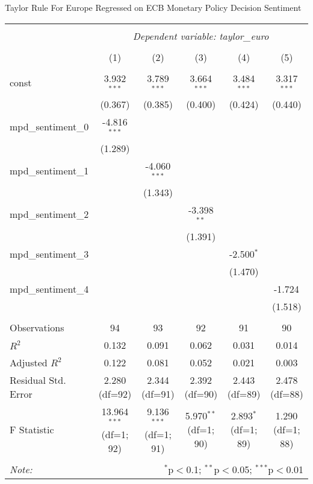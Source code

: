 \documentclass{article}
\begin{document}
Taylor Rule For Europe Regressed on ECB Monetary Policy Decision Sentiment

\begin{table}[H]
\begin{adjustbox}{width=\textwidth}
\centering
\begin{tabular}{@{}lccccc@{}}
\\[-1.8ex]\hline
\hline \\[-1.8ex]
& \multicolumn{5}{c}{\textit{Dependent variable: taylor\_euro}} \\
\cline{2-6}
\\[-1.8ex] & (1) & (2) & (3) & (4) & (5) \\
\hline \\[-1.8ex]
const & 3.932$^{***}$ & 3.789$^{***}$ & 3.664$^{***}$ & 3.484$^{***}$ & 3.317$^{***}$ \\
& (0.367) & (0.385) & (0.400) & (0.424) & (0.440) \\
mpd\_sentiment\_0 & -4.816$^{***}$ & & & & \\
& (1.289) & & & & \\
mpd\_sentiment\_1 & & -4.060$^{***}$ & & & \\
& & (1.343) & & & \\
mpd\_sentiment\_2 & & & -3.398$^{**}$ & & \\
& & & (1.391) & & \\
mpd\_sentiment\_3 & & & & -2.500$^{*}$ & \\
& & & & (1.470) & \\
mpd\_sentiment\_4 & & & & & -1.724$^{}$ \\
& & & & & (1.518) \\
\hline \\[-1.8ex]
Observations & 94 & 93 & 92 & 91 & 90 \\
$R^2$ & 0.132 & 0.091 & 0.062 & 0.031 & 0.014 \\
Adjusted $R^2$ & 0.122 & 0.081 & 0.052 & 0.021 & 0.003 \\
Residual Std. Error & 2.280 (df=92) & 2.344 (df=91) & 2.392 (df=90) & 2.443 (df=89) & 2.478 (df=88) \\
F Statistic & 13.964$^{***}$ (df=1; 92) & 9.136$^{***}$ (df=1; 91) & 5.970$^{**}$ (df=1; 90) & 2.893$^{*}$ (df=1; 89) & 1.290$^{}$ (df=1; 88) \\
\hline
\hline \\[-1.8ex]
\textit{Note:} & \multicolumn{5}{r}{$^{*}$p$<$0.1; $^{**}$p$<$0.05; $^{***}$p$<$0.01} \\
\end{tabular}
\end{adjustbox}
\end{table}
\end{document}
